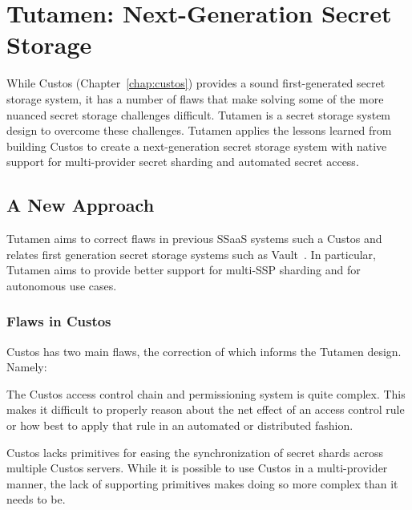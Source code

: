 \chapter{Tutamen: Next-Generation Secret Storage}
\label{chap:tutamen}

While Custos (Chapter~\ref{chap:custos}) provides a sound
first-generated secret storage system, it has a number of flaws that
make solving some of the more nuanced secret storage challenges
difficult. Tutamen is a secret storage system design to overcome these
challenges. Tutamen applies the lessons learned from building Custos
to create a next-generation secret storage system with native support
for multi-provider secret sharding and automated secret access.

\section{A New Approach}
\label{chap:tutamen:new}

Tutamen aims to correct flaws in previous SSaaS systems such a Custos
and relates first generation secret storage systems such as
Vault~\cite{vault}. In particular, Tutamen aims to provide better
support for multi-SSP sharding and for autonomous use cases.

\subsection{Flaws in Custos}

Custos has two main flaws, the correction of which informs the Tutamen
design. Namely:

\begin{packed_item}
\item The Custos access control chain and permissioning system is
  quite complex. This makes it difficult to properly reason about the
  net effect of an access control rule or how best to apply that rule
  in an automated or distributed fashion.
\item Custos lacks primitives for easing the synchronization of secret
  shards across multiple Custos servers. While it is possible to use
  Custos in a multi-provider manner, the lack of supporting primitives
  makes doing so more complex than it needs to be.
\end{packed_item}

